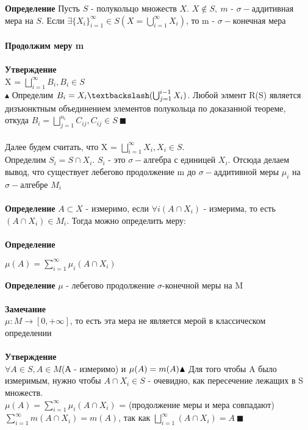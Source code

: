 \textbf{Определение} Пусть $S$ - полукольцо множеств $X$. $X \not\in S, \ m$ - $\sigma-$аддитивная мера на $S$. Если $\exists \{X_i\}_{i=1}^{\infty} \in S \left( X = \bigcup_{i=1}^{\infty}X_i\right)$, то m -  $\sigma-$конечная мера
\\
\\
\textbf{Продолжим меру m}
\\
\\
\textbf{Утверждение}\\
X = $\bigsqcup_{i=1}^{\infty} B_i, B_i \in S$
\\
$\blacktriangle$ Определим $B_i = X_i\textbackslash (\bigcup_{j=1}^{i-1}X_i)$. Любой элмент  R(S) является дизъюнктным объединением элементов полукольца по доказанной теореме, откуда  $B_i = \bigsqcup_{j=1}^{n_i} C_{ij}, C_{ij} \in S \ \blacksquare$
\\
\\
Далее будем считать, что X = $\bigsqcup_{i=1}^{\infty} X_i, X_i \in S$.
\\
Определим $S_i = S \cap X_i$. $S_i$ - это $\sigma-$алгебра с единицей $X_i$. Отсюда делаем вывод, что существует лебегово продолжение m до $\sigma-$аддитивной меры $\mu_i$ на $\sigma-$алгебре $M_i$
\\
\\
\textbf{Определение} $A \subset X$ - измеримо, если $\forall i (A \cap X_i)$ - измерима, то есть $(A \cap X_i) \in M_i$. Тогда можно определить меру:
\\
\\
\textbf{Определение} 
\begin{center}
    $\mu(A) = \sum\limits_{i=1}^{\infty} \mu_i(A \cap X_i)$
\end{center}
\textbf{Определение} $\mu$ - лебегово продолжение $\sigma$-конечной меры на M
\\
\\
\textbf{Замечание} 
\\
$\mu: M \rightarrow [0, +\infty]$, то есть эта мера не является мерой в классическом определении
\\
\\
\textbf{Утверждение}
\\
$\forall A \in S, A\in M$(А - измеримо) и $\mu(A) = m(A) \\ \blacktriangle \\$
Для того чтобы A было измеримым, нужно чтобы $A \cap X_i \in S$ - очевидно, как пересечение лежащих в S множеств.
\\
$\mu(A) = \sum\limits_{i=1}^{\infty} \mu_i(A \cap X_i)$ = (продолжение меры и мера совпадают) $\sum\limits_{i=1}^{\infty} m(A \cap X_i) = m(A)$, так как $\bigsqcup_{i=1}^{\infty} (A \cap X_i) = A \ \blacksquare$
